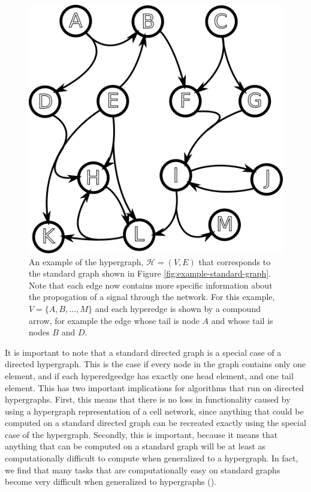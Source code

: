\documentclass[12pt,twoside]{reedthesis}
\theoremstyle{definition}
\begin{document}
\begin{figure}[thbp]
  \begin{center}
    \includegraphics[width=\textwidth/2]{example-hypergraph}
  \caption[An example directed hypergraph]{An example of the hypergraph, $\mathcal{H}=(V,E)$ that corresponds to the standard graph shown in Figure \ref{fig:example-standard-graph}. Note that each edge now contains more specific information about the propogation of a signal through the network. For this example, $V=\{A,B,...,M\}$ and each hyperedge is shown by a compound arrow, for example the edge whose tail is node $A$ and whose tail is nodes $B$ and $D$.}
  \label{fig:example-hypergraph}
  \end{center}
\end{figure}

It is important to note that a standard directed graph is a special case of a directed hypergraph.  This is the case if every node in the graph contains only one element, and if each hyperedgeedge has exactly one head element, and one tail element.  This has two important implications for algorithms that run on directed hypergraphs.  First, this means that there is no loss in functionality caused by using a hypergraph representation of a cell network, since anything that could be computed on a standard directed graph can be recreated exactly using the special case of the hypergraph. Secondly, this is important, because it means that anything that can be computed on a standard graph will be at least as computationally difficult to compute when generalized to a hypergraph.  In fact, we find that many tasks that are computationally easy on standard graphs become very difficult when generalized to hypergraphs (\cite{Ritz2014a}).\par
\end{document}
